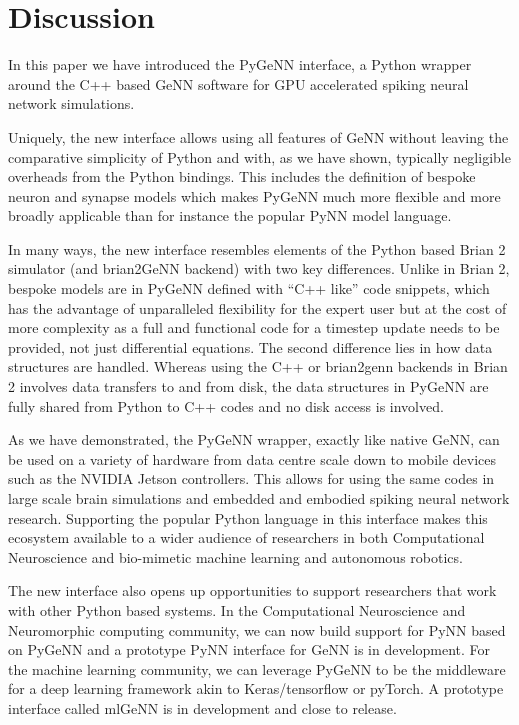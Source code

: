\documentclass[utf8]{frontiersSCNS} %
\begin{document}
\section{Discussion}
In this paper we have introduced the PyGeNN interface, a Python wrapper around the C++ based GeNN software for GPU accelerated spiking neural network simulations.

Uniquely, the new interface allows using all features of GeNN without leaving the comparative simplicity of Python and with, as we have shown, typically negligible overheads from the Python bindings.
This includes the definition of bespoke neuron and synapse models which makes PyGeNN much more flexible and more broadly applicable than for instance the popular PyNN model language.

In many ways, the new interface resembles elements of the Python based Brian 2 simulator (and brian2GeNN backend) with two key differences.
Unlike in Brian 2, bespoke models are in PyGeNN defined with ``C++ like'' code snippets, which has the advantage of unparalleled flexibility for the expert user but at the cost of more complexity as a full and functional code for a timestep update needs to be provided, not just differential equations.
The second difference lies in how data structures are handled. Whereas using the C++ or brian2genn backends in Brian 2 involves data transfers to and from disk, the data structures in PyGeNN are fully shared from Python to C++ codes and no disk access is involved.

As we have demonstrated, the PyGeNN wrapper, exactly like native GeNN, can be used on a variety of hardware from data centre scale down to mobile devices such as the NVIDIA Jetson controllers.
This allows for using the same codes in large scale brain simulations and embedded and embodied spiking neural network research.
Supporting the popular Python language in this interface makes this ecosystem available to a wider audience of researchers in both Computational Neuroscience and bio-mimetic machine learning and autonomous robotics.

The new interface also opens up opportunities to support researchers that work with other Python based systems.
In the Computational Neuroscience and Neuromorphic computing community, we can now build support for PyNN based on PyGeNN and a prototype PyNN interface for GeNN is in development.
For the machine learning community, we can leverage PyGeNN to be the middleware for a deep learning framework akin to Keras/tensorflow or pyTorch.
A prototype interface called mlGeNN is in development and close to release.
\end{document}
